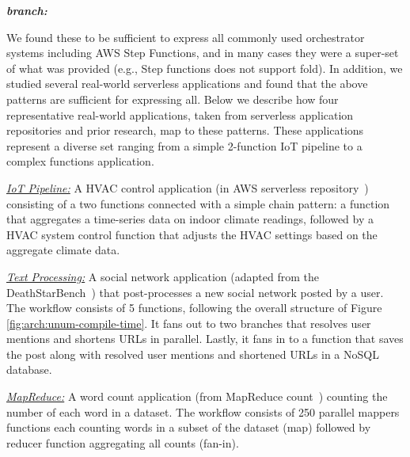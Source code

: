 	\item \textit{\textbf{branch:}} 

\squishend\vspace{-1ex}
	

We found these to be sufficient to express all commonly used orchestrator systems including AWS Step
Functions,  and in many cases they were a super-set of what was provided (e.g., Step functions does not support fold). In addition, we studied several real-world serverless applications and found that the above patterns are sufficient for expressing all.  Below we describe how four representative real-world applications, taken from serverless application repositories and prior research, map to these patterns. These applications represent a diverse set ranging from a simple 2-function IoT pipeline to a complex  functions application.

\noindent\underline{\textit{IoT Pipeline:}} A HVAC control application (in
	AWS serverless repository~\cite{iot-pipeline}) consisting  of a
	two functions connected with a simple chain pattern: a function that aggregates  a time-series data
	on indoor climate readings,  followed by a HVAC system control function that
	adjusts the HVAC settings based on the aggregate climate data.
	
	\noindent \underline{\textit{Text Processing:}} A social network application (adapted from
	the DeathStarBench~\cite{deathstar}) that post-processes a new social network posted by a user.  The workflow consists of 5 functions, following the overall structure of Figure \ref{fig:arch:unum-compile-time}.
	It fans out to two branches that resolves user mentions and shortens URLs
	in parallel.  Lastly, it fans in to a function that saves the post along
	with resolved user mentions and shortened URLs in a NoSQL database.
	
	 \noindent \underline{\textit{MapReduce:}} A word count application (from MapReduce 
	count~\cite{mapreduce}) counting the number of each word in a dataset. The workflow consists of 250 parallel mappers functions each counting words in a subset of the dataset (map) followed by  reducer function aggregating all counts (fan-in).
	
